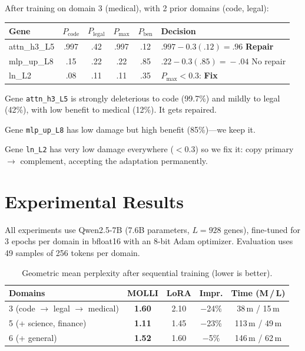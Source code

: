 \documentclass[11pt,letterpaper]{article}
\theoremstyle{definition}
\begin{document}
\begin{tcolorbox}[exbox, title={Repair Candidate Selection}]
After training on domain 3 (medical), with 2 prior domains (code, legal):
\begin{center}
\small
\begin{tabular}{@{}lccccp{3.2cm}@{}}
\toprule
Gene & $P_\text{code}$ & $P_\text{legal}$ & $P_\text{max}$ & $P_\text{ben}$ & Decision \\
\midrule
attn\_h3\_L5 & .997 & .42 & .997 & .12 & $.997\!-\!0.3(.12)\!=\!.96$ \textbf{Repair} \\
mlp\_up\_L8 & .15 & .22 & .22 & .85 & $.22\!-\!0.3(.85)\!=\!-.04$ No repair \\
ln\_L2 & .08 & .11 & .11 & .35 & $P_\text{max}\!<\!0.3$: \textbf{Fix} \\
\bottomrule
\end{tabular}
\end{center}

Gene \texttt{attn\_h3\_L5} is strongly deleterious to code (99.7\%) and mildly to legal (42\%), with low benefit to medical (12\%). It gets repaired.

Gene \texttt{mlp\_up\_L8} has low damage but high benefit (85\%)---we keep it.

Gene \texttt{ln\_L2} has very low damage everywhere ($< 0.3$) so we fix it: copy primary $\to$ complement, accepting the adaptation permanently.
\end{tcolorbox}


\section{Experimental Results}
\label{sec:results}

All experiments use Qwen2.5-7B (7.6B parameters, $L = 928$ genes), fine-tuned for 3 epochs per domain in bfloat16 with an 8-bit Adam optimizer. Evaluation uses 49 samples of 256 tokens per domain.

\begin{table}[H]
\centering
\caption{Geometric mean perplexity after sequential training (lower is better).}
\label{tab:scaling}
\small
\begin{tabular}{@{}lcccc@{}}
\toprule
\textbf{Domains} & \textbf{MOLLI} & \textbf{LoRA} & \textbf{Impr.} & \textbf{Time (M\,/\,L)} \\
\midrule
3 (code $\to$ legal $\to$ medical) & \textbf{1.60} & 2.10 & $-$24\% & 38\,m / 15\,m \\
\rowcolor{wingreen}
5 (+ science, finance) & \textbf{1.11} & 1.45 & $-$23\% & 113\,m / 49\,m \\
6 (+ general) & \textbf{1.52} & 1.60 & $-$5\% & 146\,m / 62\,m \\
\bottomrule
\end{tabular}
\end{table}
\end{document}
